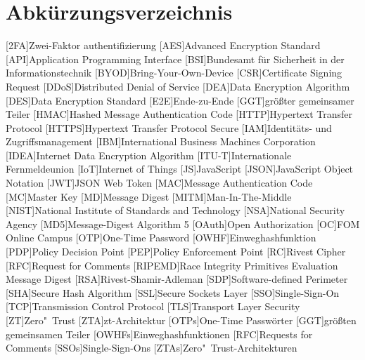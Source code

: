 \section*{Abkürzungsverzeichnis}


\begin{acronym}
[RIPEMD]
    \itemsep0pt %
    [2FA]{Zwei-Faktor \gls{authentifizierung}}
    [AES]{Advanced Encryption Standard}
    [API]{Application Programming Interface}
    [BSI]{Bundesamt für Sicherheit in der Informationstechnik}
    [BYOD]{Bring-Your-Own-Device}
    [CSR]{Certificate Signing Request}
    [DDoS]{Distributed Denial of Service}
    [DEA]{Data Encryption Algorithm}
    [DES]{Data Encryption Standard}
    [E2E]{Ende-zu-Ende}
    [GGT]{größter gemeinsamer Teiler}
    [HMAC]{Hashed Message Authentication Code}
    [HTTP]{Hypertext Transfer Protocol}
    [\acs{HTTP}S]{Hypertext Transfer Protocol Secure}
    [IAM]{Identitäts- und Zugriffsmanagement}
    [IBM]{International Business Machines Corporation}
    [IDEA]{Internet Data Encryption Algorithm}
    [ITU-T]{Internationale Fernmeldeunion}
    [IoT]{Internet of Things}
    [JS]{JavaScript}
    [JSON]{JavaScript Object Notation}
    [JWT]{JSON Web Token}
    [MAC]{Message Authentication Code}
    [MC]{Master Key}
    [MD]{Message Digest}
    [MITM]{Man-In-The-Middle}
    [NIST]{National Institute of Standards and Technology}
    [NSA]{National Security Agency}
    [MD5]{Message-Digest Algorithm 5}
    [OAuth]{Open Authorization}
    [OC]{FOM Online Campus}
    [OTP]{One-Time Password}
    [OWHF]{Einweghashfunktion}
    [PDP]{Policy Decision Point}
    [PEP]{Policy Enforcement Point}
    [RC]{Rivest Cipher}
    [RFC]{Request for Comments}
    [RIPEMD]{Race Integrity Primitives Evaluation Message Digest}
    [RSA]{Rivest-Shamir-Adleman}
    [SDP]{Software-defined Perimeter}
    [SHA]{Secure Hash Algorithm}
    [SSL]{Secure Sockets Layer}
    [SSO]{Single-Sign-On}
    [TCP]{Transmission Control Protocol}
    [TLS]{Transport Layer Security}
    [ZT]{Zero"~Trust}
    [ZTA]{\acl{zt}-Architektur}
    [OTPs]{One-Time Passwörter}
    [GGT]{größten gemeinsamen Teiler}
    [OWHFs]{Einweghashfunktionen}
    [RFC]{Requests for Comments}
    [SSOs]{Single-Sign-Ons}
    [ZTAs]{Zero"~Trust-Architekturen}
\end{acronym}